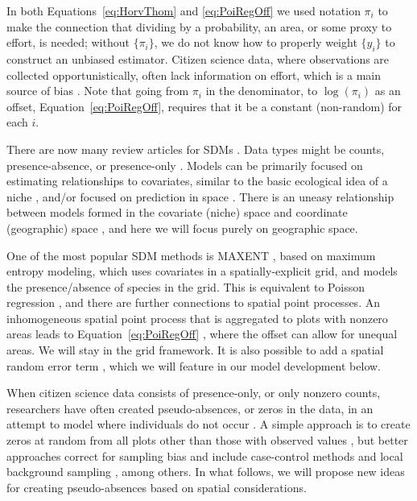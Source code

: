 \documentclass[11pt, titlepage]{article}
\begin{document}
\begin{spacing}{1.9}
\begin{flushleft}
In both Equations~\eqref{eq:HorvThom} and \eqref{eq:PoiRegOff} we used notation $\pi_{i}$ to make the connection that dividing by a probability, an area, or some proxy to effort, is needed; without $\{\pi_i\}$, we do not know how to properly weight $\{y_i\}$ to construct an unbiased estimator. Citizen science data, where observations are collected opportunistically, often lack information on effort, which is a main source of bias \citep{bird_statistical_2014}.  Note that going from $\pi_i$ in the denominator, to $\log(\pi_{i})$ as an offset, Equation~\eqref{eq:PoiRegOff}, requires that it be a constant (non-random) for each $i$.

There are now many review articles for SDMs \citep[e.g.,][]{austin_species_2007,
elith_species_2009, hefley_hierarchical_2016,
robinson_systematic_2017, araujo_standards_2019}. Data types might be counts, presence-absence, or presence-only \citep{hefley_hierarchical_2016}. Models can be primarily focused on estimating relationships to covariates, similar to the basic ecological idea of a niche \citep{soberon_grinnellian_2007,elith_species_2009}, and/or focused on prediction in space \citep{austin_spatial_2002,elith_species_2009}.  There is an uneasy relationship between models formed in the covariate (niche) space and coordinate (geographic) space \citep{randin_are_2006}, and here we will focus purely on geographic space.

One of the most popular SDM methods is MAXENT \citep{phillips_maximum_2006}, based on maximum entropy modeling, which uses covariates in a spatially-explicit grid, and models the presence/absence of species in the grid. This is equivalent to Poisson regression \citep{renner_equivalence_2013}, and there are further connections to spatial point processes. An inhomogeneous spatial point process that is aggregated to plots with nonzero areas leads to Equation~\ref{eq:PoiRegOff} \citep{warton_poisson_2010}, where the offset can allow for unequal areas.  We will stay in the grid framework. It is also possible to add a spatial random error term \citep{guelat_effects_2018}, which we will feature in our model development below.

When citizen science data consists of presence-only, or only nonzero counts, researchers have often created pseudo-absences, or zeros in the data, in an attempt to model where individuals do not occur \citep{pearce_modelling_2006, conn_extrapolating_2015}. A simple approach is to create zeros at random from all plots other than those with observed values \citep{stockwell_controlling_2002}, but better approaches correct for sampling bias \citep{phillips_sample_2009, conn_confronting_2017} and include case-control methods \citep{fithian_local_2014} and local background sampling \citep{daniel_efficient_2020}, among others. In what follows, we will propose new ideas for creating pseudo-absences based on spatial considerations.


\end{flushleft}
\end{spacing}
\end{document}
